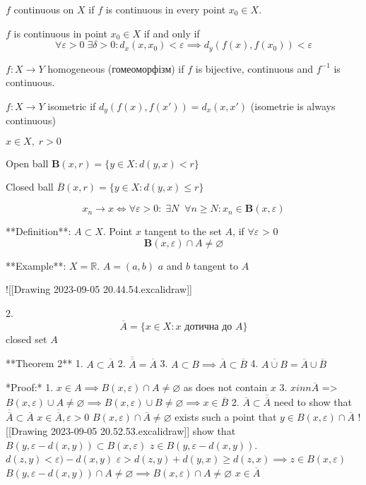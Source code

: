 \begin{definition}
$f$ continuous on $X$ if $f$ is continuous in every point $x_{0} \in X$.
\end{definition}

\begin{exercise}
 $f$ is continuous in point $x_{0} \in X$ if and only if $$
\forall \varepsilon > 0 \; \exists \delta > 0: d_{x}(x, x_{0}) < \varepsilon \implies d_{y}(f(x), f(x_{0})) < \varepsilon
$$
\end{exercise}

\begin{definition}
$f: X \to Y$ homogeneous (гомеоморфізм) if $f$ is
bijective, continuous and $f^{-1}$ is continuous.
\end{definition}

\begin{definition}
$f: X \to Y$ isometric if $d_{y}(f(x), f(x')) = d_{x}(x, x')$
(isometrie is always continuous)
\end{definition}

$x \in X, \; r > 0$
\begin{definition}
Open ball $\mathbf{B}(x, r) = \{  y \in X : d(y,x) < r \}$
\end{definition}
\begin{definition}
Closed ball $\overline{B}(x, r) = \{  y \in X: d(y, x) \leq r \}$
\end{definition}
$$
x_{n} \to x \iff \forall \varepsilon > 0 : \; 
\exists N \;\;
\forall n \geq N : x_{n} \in \mathbf{B}(x, \varepsilon)
$$

**Definition**:
$A \subset X$. Point $x$ tangent to the set $A$, if $\forall \varepsilon$ > 0
$$
\mathbf{B}(x, \varepsilon) \cap A \neq \varnothing
$$

**Example**:
$X = \mathbb{R}$. $A = (a,b)$
$a$ and $b$ tangent to $A$

![[Drawing 2023-09-05 20.44.54.excalidraw]]

2. $$
\overline{A} = \{ x \in X : x \text{ дотична до } A \}
$$
closed set $A$

**Theorem 2**
1. $A \subset \overline{A}$
2. $\overline{\overline{A}} = \overline{A}$
3. $A \subset B \implies \overline{A} \subset \overline{B}$
4. $\overline{A \cup B} = \overline{A} \cup \overline{B}$

*Proof:*
1. $x \in A \implies B(x, \varepsilon) \cap A \neq \varnothing$ as does not contain $x$
3. $ x inn \overline{A}$ => $B(x, \varepsilon) \cup A \neq \varnothing \implies B(x, \varepsilon) \cup B \neq \varnothing \implies x \in \overline{B}$
2. $\overline{A} \subset \overline{\overline{A}}$
   need to show that $\overline{\overline{A}} \subset \overline{A}$
   $x \in \overline{\overline{A}}, \varepsilon > 0$
   $B(x, \varepsilon) \cap \overline{A} \neq \varnothing$
   exists such a point that $y \in B(x, \varepsilon) \cap \overline{A}$
   ![[Drawing 2023-09-05 20.52.53.excalidraw]]
show that $B(y, \varepsilon - d(x,y)) \subset B(x, \varepsilon)$
$z \in B(y, \varepsilon - d(x, y))$.
$d(z, y) < \varepsilon) - d(x, y)$
$\varepsilon > d(z, y) + d(y, x) \geq d(z, x) \implies z \in B(x, \varepsilon)$
$B(y, \varepsilon - d(x, y)) \cap A \neq \varnothing \implies B(x, \varepsilon) \cap A \neq \varnothing$
$x \in \overline{A}$

